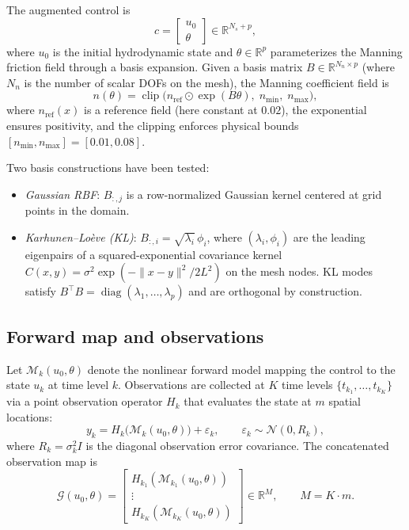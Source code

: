 \documentclass[11pt]{article}
\theoremstyle{definition}
\begin{document}
The augmented control is
\[
c = \begin{bmatrix} u_0 \\ \theta \end{bmatrix}
\in \mathbb{R}^{N_s + p},
\]
where $u_0$ is the initial hydrodynamic state and
$\theta \in \mathbb{R}^p$ parameterizes the Manning friction field
through a basis expansion.  Given a basis matrix
$B \in \mathbb{R}^{N_n \times p}$ (where $N_n$ is the number of
scalar DOFs on the mesh), the Manning coefficient field is
\begin{equation}\label{eq:manning-map}
n(\theta) = \operatorname{clip}\!\bigl(
  n_{\mathrm{ref}} \odot \exp(B\theta),\;
  n_{\min},\; n_{\max}
\bigr),
\end{equation}
where $n_{\mathrm{ref}}(x)$ is a reference field (here constant at
$0.02$), the exponential ensures positivity, and the clipping enforces
physical bounds $[n_{\min}, n_{\max}] = [0.01, 0.08]$.

Two basis constructions have been tested:
\begin{itemize}
\item \emph{Gaussian RBF}: $B_{:,j}$ is a row-normalized Gaussian
  kernel centered at grid points in the domain.
\item \emph{Karhunen--Lo\`eve (KL)}: $B_{:,i} = \sqrt{\lambda_i}\,
  \phi_i$, where $(\lambda_i, \phi_i)$ are the leading eigenpairs
  of a squared-exponential covariance kernel
  $C(x,y) = \sigma^2 \exp(-\|x-y\|^2/2L^2)$ on the mesh nodes.
  KL modes satisfy $B^\top B = \operatorname{diag}(\lambda_1,\ldots,
  \lambda_p)$ and are orthogonal by construction.
\end{itemize}

\subsection{Forward map and observations}

Let $\mathcal{M}_{k}(u_0, \theta)$ denote the nonlinear forward
model mapping the control to the state $u_k$ at time level $k$.
Observations are collected at $K$ time levels $\{t_{k_1}, \ldots,
t_{k_K}\}$ via a point observation operator $H_k$ that evaluates
the state at $m$ spatial locations:
\[
y_k = H_k\bigl(\mathcal{M}_{k}(u_0, \theta)\bigr) + \varepsilon_k,
\qquad \varepsilon_k \sim \mathcal{N}(0, R_k),
\]
where $R_k = \sigma_k^2 I$ is the diagonal observation error
covariance.  The concatenated observation map is
\[
\mathcal{G}(u_0, \theta) =
\begin{bmatrix}
H_{k_1}(\mathcal{M}_{k_1}(u_0,\theta)) \\
\vdots \\
H_{k_K}(\mathcal{M}_{k_K}(u_0,\theta))
\end{bmatrix}
\in \mathbb{R}^{M}, \qquad M = K \cdot m.
\]
\end{document}
